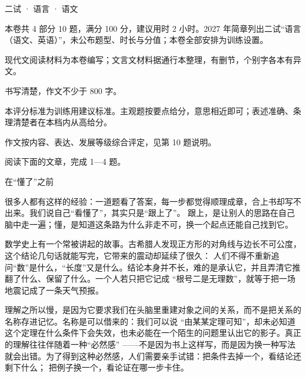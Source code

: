 \documentclass[cjk=noto, seal=first]{mojing-exam}
\begin{document}
\begin{paper}[time={建议 2 小时（训练设置）}, full=100]{二试 · 语言 · 语文}

\begin{instructions}
  \item 本卷共 4 部分 10 题，满分 100 分，建议用时 2 小时。2027 年简章列出二试“语言（语文、英语）”，未公布题型、时长与分值；本卷全部安排为训练设置。
  \item 现代文阅读材料为本卷编写；文言文材料据通行本整理，有删节，个别字各本有异文。
  \item 书写清楚，作文不少于 800 字。
\end{instructions}

\begin{gradingnotes}
  \item 本评分标准为训练用建议标准。主观题按要点给分，意思相近即可；表述准确、条理清楚者在本档内从高给分。
  \item 作文按内容、表达、发展等级综合评定，见第 10 题说明。
\end{gradingnotes}



阅读下面的文章，完成 1—4 题。

\begin{center}\heiti 在“懂了”之前\end{center}

\noindent\hspace{2em}很多人都有这样的经验：一道题看了答案，每一步都觉得顺理成章，合上书却写不出来。我们说自己“看懂了”，其实只是“跟上了”。
跟上，是让别人的思路在自己脑中走一遍；懂，是知道这条路为什么非走不可，换一个起点还能自己找到它。

\hspace{2em}数学史上有一个常被讲起的故事。古希腊人发现正方形的对角线与边长不可公度，这个结论几句话就能写完，它带来的震动却延续了很久：
人们不得不重新追问“数”是什么，“长度”又是什么。结论本身并不长，难的是承认它，并且弄清它推翻了什么、保留了什么。一个人若只把它记成
“根号二是无理数”，就等于把一场地震记成了一条天气预报。

\hspace{2em}理解之所以慢，是因为它要求我们在头脑里重建对象之间的关系，而不是把关系的名称存进记忆。名称是可以借来的：我们可以说
“由某某定理可知”，却未必知道这个定理在什么条件下会失效，也未必能在一个陌生的问题里认出它的影子。真正的理解往往伴随着一种“必然感”
——不是因为书上这样写，而是因为换一种写法就会出错。为了得到这种必然感，人们需要亲手试错：把条件去掉一个，看结论还剩下什么；
把例子换一个，看论证在哪一步卡住。


\end{paper}
\end{document}
